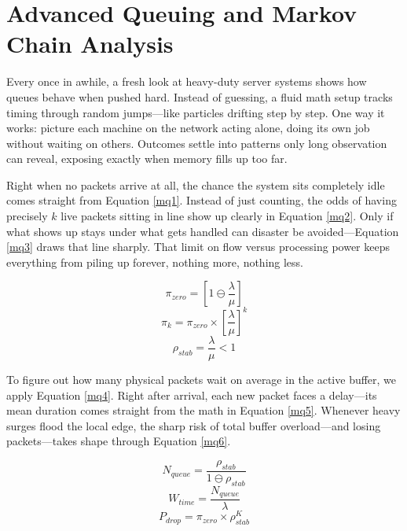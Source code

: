 \documentclass[a4paper,fleqn]{cas-dc}
\numberwithin{equation}{section}
\begin{document}
\section{Advanced Queuing and Markov Chain Analysis}

Every once in awhile, a fresh look at heavy-duty server systems shows how queues behave when pushed hard. Instead of guessing, a fluid math setup tracks timing through random jumps—like particles drifting step by step. One way it works: picture each machine on the network acting alone, doing its own job without waiting on others. Outcomes settle into patterns only long observation can reveal, exposing exactly when memory fills up too far.

Right when no packets arrive at all, the chance the system sits completely idle comes straight from Equation \ref{mq1}. Instead of just counting, the odds of having precisely $k$ live packets sitting in line show up clearly in Equation \ref{mq2}. Only if what shows up stays under what gets handled can disaster be avoided—Equation \ref{mq3} draws that line sharply. That limit on flow versus processing power keeps everything from piling up forever, nothing more, nothing less.

\begin{equation} \pi_{zero} = \left[ 1 \ominus \frac{\lambda}{\mu} \right] \label{mq1} \end{equation}
\begin{equation} \pi_{k} = \pi_{zero} \times \left[ \frac{\lambda}{\mu} \right]^{k} \label{mq2} \end{equation}
\begin{equation} \rho_{stab} = \frac{\lambda}{\mu} < 1 \label{mq3} \end{equation}

To figure out how many physical packets wait on average in the active buffer, we apply Equation \ref{mq4}. Right after arrival, each new packet faces a delay—its mean duration comes straight from the math in Equation \ref{mq5}. Whenever heavy surges flood the local edge, the sharp risk of total buffer overload—and losing packets—takes shape through Equation \ref{mq6}.

\begin{equation} N_{queue} = \frac{\rho_{stab}}{1 \ominus \rho_{stab}} \label{mq4} \end{equation}
\begin{equation} W_{time} = \frac{N_{queue}}{\lambda} \label{mq5} \end{equation}
\begin{equation} P_{drop} = \pi_{zero} \times \rho_{stab}^{K} \label{mq6} \end{equation}
\end{document}
